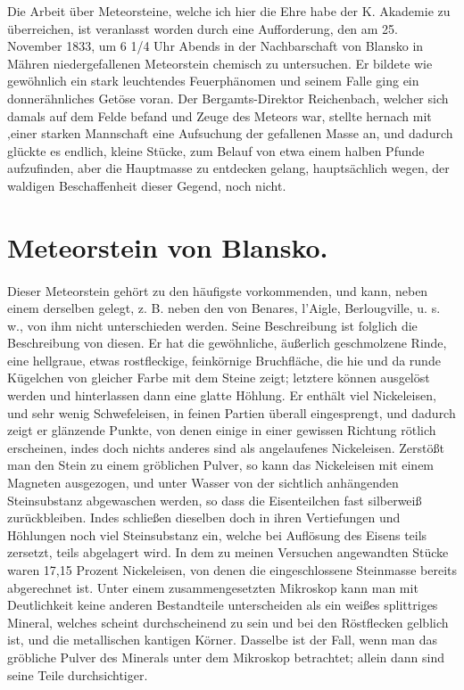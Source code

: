 \documentclass[a4paper, 11pt, oneside]{article}
\begin{document}
Die Arbeit über Meteorsteine, welche ich hier die Ehre habe der K. Akademie zu überreichen, ist veranlasst worden durch eine Aufforderung, den am 25. November 1833, um 6 1/4 Uhr Abends in der Nachbarschaft von Blansko in Mähren niedergefallenen Meteorstein chemisch zu untersuchen. Er bildete wie gewöhnlich ein stark leuchtendes Feuerphänomen und seinem Falle ging ein donnerähnliches Getöse voran. Der Bergamts-Direktor Reichenbach, welcher sich damals auf dem Felde befand und Zeuge des Meteors war, stellte hernach mit ‚einer starken Mannschaft eine Aufsuchung der gefallenen Masse an, und dadurch glückte es endlich, kleine Stücke, zum Belauf von etwa einem halben Pfunde aufzufinden, aber die Hauptmasse zu entdecken gelang, hauptsächlich wegen, der waldigen Beschaffenheit dieser Gegend, noch nicht.

\section{Meteorstein von Blansko.}
\paragraph{}
Dieser Meteorstein gehört zu den häufigste vorkommenden, und kann, neben einem derselben gelegt, z. B. neben den von Benares, l’Aigle, Berlougville, u. s. w., von ihm nicht unterschieden werden. Seine Beschreibung ist folglich die Beschreibung von diesen. Er hat die gewöhnliche, äußerlich geschmolzene Rinde, eine hellgraue, etwas rostfleckige, feinkörnige Bruchfläche, die hie und da runde Kügelchen von gleicher Farbe mit dem Steine zeigt; letztere können ausgelöst werden und hinterlassen dann eine glatte Höhlung. Er enthält viel Nickeleisen, und sehr wenig Schwefeleisen, in feinen Partien überall eingesprengt, und dadurch zeigt er glänzende Punkte, von denen einige in einer gewissen Richtung rötlich erscheinen, indes doch nichts anderes sind als angelaufenes Nickeleisen. Zerstößt man den Stein zu einem gröblichen Pulver, so kann das Nickeleisen mit einem Magneten ausgezogen, und unter Wasser von der sichtlich anhängenden Steinsubstanz abgewaschen werden, so dass die Eisenteilchen fast silberweiß zurückbleiben. Indes schließen dieselben doch in ihren Vertiefungen und Höhlungen noch viel Steinsubstanz ein, welche bei Auflösung des Eisens teils zersetzt, teils abgelagert wird. In dem zu meinen Versuchen angewandten Stücke waren 17,15 Prozent Nickeleisen, von denen die eingeschlossene Steinmasse bereits abgerechnet ist. Unter einem zusammengesetzten Mikroskop kann man mit Deutlichkeit keine anderen Bestandteile unterscheiden als ein weißes splittriges Mineral, welches scheint durchscheinend zu sein und bei den Röstflecken gelblich ist, und die metallischen kantigen Körner. Dasselbe ist der Fall, wenn man das gröbliche Pulver des Minerals unter dem Mikroskop betrachtet; allein dann sind seine Teile durchsichtiger.
\end{document}
